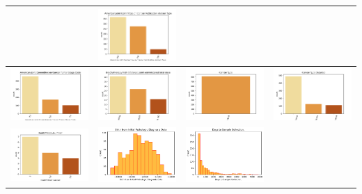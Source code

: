 \begin{table}
\begin{center}
\begin{tabular}{ |c|c|c|c| }
			& \includegraphics[width=.25\textwidth]{NOTEBOOK/IMAGENES_CRUDAS/8} 
			\\  \hline 
			\includegraphics[width=.25\textwidth]{NOTEBOOK/IMAGENES_CRUDAS/9} 
			& \includegraphics[width=.25\textwidth]{NOTEBOOK/IMAGENES_CRUDAS/10} 
			& \includegraphics[width=.25\textwidth]{NOTEBOOK/IMAGENES_CRUDAS/11} 
			& \includegraphics[width=.25\textwidth]{NOTEBOOK/IMAGENES_CRUDAS/12} 
			\\  \hline 
			\includegraphics[width=.25\textwidth]{NOTEBOOK/IMAGENES_CRUDAS/13} 
			& \includegraphics[width=.25\textwidth]{NOTEBOOK/IMAGENES_CRUDAS/14} 
			& \includegraphics[width=.25\textwidth]{NOTEBOOK/IMAGENES_CRUDAS/15} 

\end{tabular}
\end{center}
\end{table}

